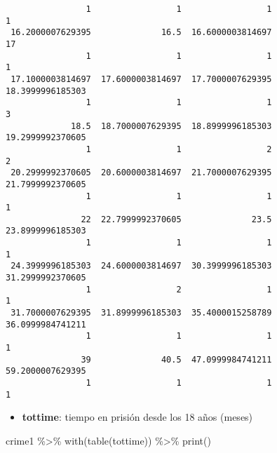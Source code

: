 \documentclass[
  letterpaper,
  DIV=11,
  numbers=noendperiod]{scrreprt}
\newenvironment{Shaded}{\begin{snugshade}}{\end{snugshade}}
\newcommand{\FunctionTok}[1]{\textcolor[rgb]{0.28,0.35,0.67}{#1}}
\newcommand{\NormalTok}[1]{\textcolor[rgb]{0.00,0.23,0.31}{#1}}
\newcommand{\SpecialCharTok}[1]{\textcolor[rgb]{0.37,0.37,0.37}{#1}}
\providecommand{\tightlist}{%
  \setlength{\itemsep}{0pt}\setlength{\parskip}{0pt}}\usepackage{longtable,booktabs,array}
\begin{document}
\begin{verbatim}
                1                 1                 1                 1 
 16.2000007629395              16.5  16.6000003814697                17 
                1                 1                 1                 1 
 17.1000003814697  17.6000003814697  17.7000007629395  18.3999996185303 
                1                 1                 1                 3 
             18.5  18.7000007629395  18.8999996185303  19.2999992370605 
                1                 1                 2                 2 
 20.2999992370605  20.6000003814697  21.7000007629395  21.7999992370605 
                1                 1                 1                 1 
               22  22.7999992370605              23.5  23.8999996185303 
                1                 1                 1                 1 
 24.3999996185303  24.6000003814697  30.3999996185303  31.2999992370605 
                1                 2                 1                 1 
 31.7000007629395  31.8999996185303  35.4000015258789  36.0999984741211 
                1                 1                 1                 1 
               39              40.5  47.0999984741211  59.2000007629395 
                1                 1                 1                 1 
\end{verbatim}

\begin{itemize}
\tightlist
\item
  \textbf{tottime}: tiempo en prisión desde los 18 años (meses)
\end{itemize}

\begin{Shaded}
\begin{Highlighting}[]
\NormalTok{crime1 }\SpecialCharTok{\%\textgreater{}\%} 
  \FunctionTok{with}\NormalTok{(}\FunctionTok{table}\NormalTok{(tottime)) }\SpecialCharTok{\%\textgreater{}\%} 
  \FunctionTok{print}\NormalTok{()}
\end{Highlighting}
\end{Shaded}
\end{document}
